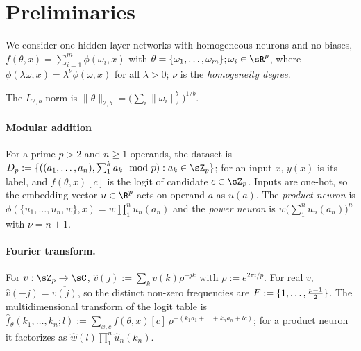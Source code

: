 \section{Preliminaries}\label{sec:prelim}

We consider one-hidden-layer networks with homogeneous neurons and no biases, $f(\theta,x)=\sum_{i=1}^m\phi(\omega_i,x)$ with $\theta=\{\omega_1,\dots,\omega_m\}; \omega_i\in\sR^p$, where $\phi(\lambda\omega,x)=\lambda^\nu\phi(\omega,x)$ for all $\lambda>0$; $\nu$ is the \emph{homogeneity degree}. 

The $L_{2,b}$ norm is $\|\theta\|_{2,b}=\big(\sum_i\|\omega_i\|_2^b\big)^{1/b}$. 
\paragraph{Modular addition} For a prime $p>2$ and $n\ge1$ operands, the dataset is $D_p:=\{((a_1,\dots,a_n),\sum_{1}^{k}a_k \mod p):a_k\in\sZ_p\}$; for an input $x$, $y(x)$ is its label, and $f(\theta,x)[c]$ is the logit of candidate $c\in\sZ_p$. Inputs are one-hot, so the embedding vector $u\in\R^p$ acts on operand $a$ as $u(a)$. The \emph{product neuron} is $\phi(\{u_1,\dots,u_n,w\},x)=w\prod_{1}^{n}u_n(a_n)$ and the \emph{power neuron} is $w\big(\sum_{1}^{n}u_n(a_n)\big)^n$ with $\nu=n+1$.

\paragraph{Fourier transform.} For $v:\sZ_p\to\sC$, $\hat v(j):=\sum_kv(k)\rho^{-jk}$ with $\rho:=e^{2\pi i/p}$. For real $v$, $\hat v(-j)=\overline{\hat v(j)}$, so the distinct non-zero frequencies are $F:=\{1,\dots,\frac{p-1}2\}$. The multidimensional transform of the logit table is $\hat f_\theta(k_1,\dots,k_n;l):=\sum_{x,c}f(\theta,x)[c]\,\rho^{-(k_1a_1+\dots+k_na_n+lc)}$; for a product neuron it factorizes as $\hat w(l)\prod_{1}^{n}\hat u_n(k_n)$.
